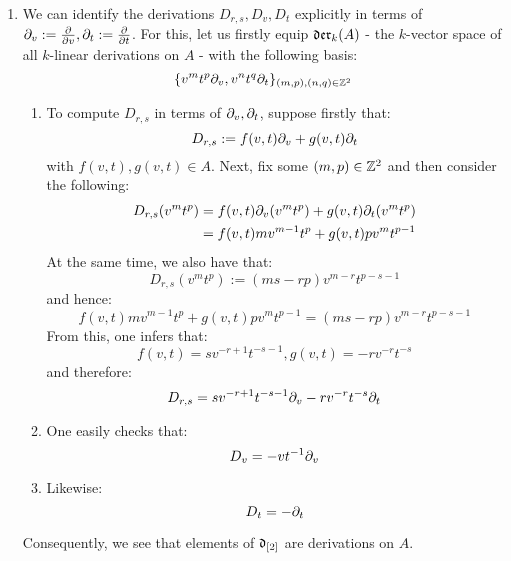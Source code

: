         \begin{remark} \label{remark: dual_of_toroidal_centres_contains_derivations}
            \begin{enumerate}
                \item We can identify the derivations $D_{r, s}, D_v, D_t$ explicitly in terms of $\partial_v := \frac{\partial}{\partial v}, \partial_t := \frac{\partial}{\partial t}$. For this, let us firstly equip $\mathfrak{der}_{k}(A)$ - the $k$-vector space of all $k$-linear derivations on $A$ - with the following basis:
                    $$\{ v^m t^p \partial_v, v^n t^q \partial_t \}_{(m, p), (n, q) \in \mathbb{Z}^2}$$
                \begin{enumerate}
                    \item To compute $D_{r, s}$ in terms of $\partial_v, \partial_t$, suppose firstly that:
                        $$D_{r, s} := f(v, t) \partial_v + g(v, t) \partial_t$$
                    with $f(v, t), g(v, t) \in A$. Next, fix some $(m, p) \in \mathbb{Z}^2$ and then consider the following:
                        $$
                            \begin{aligned}
                                D_{r, s}( v^m t^p ) & = f(v, t) \partial_v( v^m t^p ) + g(v, t) \partial_t( v^m t^p )
                                \\
                                & = f(v, t) m v^{m - 1} t^p + g(v, t) p v^m t^{p - 1}
                            \end{aligned}
                        $$
                    At the same time, we also have that:
                        $$D_{r, s}(v^m t^p) := ( ms - rp ) v^{m - r} t^{p - s - 1}$$
                    and hence:
                        $$f(v, t) m v^{m - 1} t^p + g(v, t) p v^m t^{p - 1} = ( ms - rp ) v^{m - r} t^{p - s - 1}$$
                    From this, one infers that:
                        $$f(v, t) = s v^{-r + 1} t^{-s - 1}, g(v, t) = -r v^{-r} t^{-s}$$
                    and therefore:
                        $$D_{r, s} = s v^{-r + 1} t^{-s - 1} \partial_v - r v^{-r} t^{-s} \partial_t$$
                    \item One easily checks that:
                        $$D_v = -v t^{-1} \partial_v$$
                    \item Likewise:
                        $$D_t = -\partial_t$$
                \end{enumerate}
                Consequently, we see that elements of $\mathfrak{d}_{[2]}$ are derivations on $A$.
    

\end{enumerate}
\end{remark}
